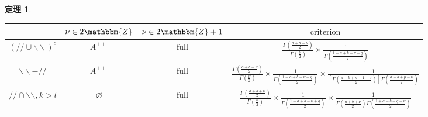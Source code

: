\documentclass[12pt]{msjproc} %
\newcommand{\tmop}[1]{\ensuremath{\operatorname{#1}}}
\newtheorem{theorem}{定理}
\begin{document}
\begin{versiona}
\begin{theorem}
\begin{enumerate}
\begin{enumerate}
      \begin{center}
        \begin{center}
          \begin{tabular}{|c|c|c|c|}
            \hline
            & $\nu \in 2\mathbbm{Z}$ & $\nu \in 2\mathbbm{Z}+ 1$ &
            $\tmop{criterion}$\\
            \hline
            $(/ / \cup \backslash\backslash)^c$ & $A^{+ +}$ & $\tmop{full}$ &
            $\frac{\Gamma \left( \frac{a + b + \nu}{2} \right)}{\Gamma \left(
            \frac{\nu}{2} \right)} \times \frac{1}{\Gamma \left( \frac{1 - a +
            b - \nu + q}{2} \right)}$\\
            \hline
            $\backslash\backslash - / /$ & $A^{+ +}$ & $\tmop{full}$ &
            $\frac{\Gamma \left( \frac{a + b + \nu}{2} \right)}{\Gamma \left(
            \frac{\nu}{2} \right)} \times \frac{1}{\Gamma \left( \frac{1 - a +
            b - \nu + q}{2} \right)} \times \frac{1}{\left[ \Gamma \left(
            \frac{a + b + n - 1 - \nu}{2} \right) \right] \Gamma \left(
            \frac{a - b + p - \nu}{2} \right)}$\\
            \hline
            $/ / \cap \backslash\backslash, k > l$ & $\varnothing$ &
            $\tmop{full}$ & $\frac{\Gamma \left( \frac{a + b + \nu}{2}
            \right)}{\Gamma \left( \frac{\nu}{2} \right)} \times
            \frac{1}{\Gamma \left( \frac{1 - a + b - \nu + q}{2} \right)}
            \times \frac{1}{\Gamma \left( \frac{a + b + \nu}{2} \right) \Gamma
            \left( \frac{1 + a - b - q + \nu}{2} \right)}$\\
            \hline
          \end{tabular}
        \end{center}
      \end{center}
      

\end{enumerate}
\end{enumerate}
\end{theorem}
\end{versiona}
\end{document}
